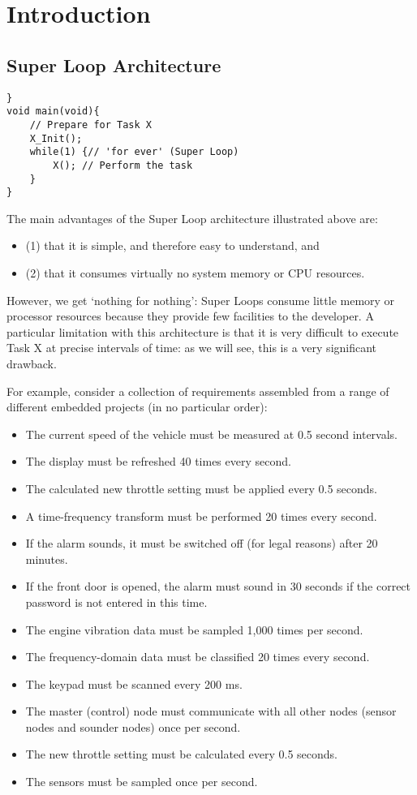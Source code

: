 
\section{Introduction}
\subsection{Super Loop Architecture}
\begin{lstlisting}[basicstyle=\small, caption=Super loop program,label = {program_super_loop}]
}
void main(void){
    // Prepare for Task X
    X_Init();
    while(1) {// 'for ever' (Super Loop)
        X(); // Perform the task
    } 
}
\end{lstlisting}
The main advantages of the Super Loop architecture illustrated above are:
\begin{itemize}
    \item (1) that it is simple, and therefore easy to understand, and 
    \item (2) that it consumes virtually no system memory or CPU resources.
\end{itemize}

However, we get ‘nothing for nothing’: Super Loops consume little memory or
processor resources because they provide few facilities to the developer. A particular
limitation with this architecture is that it is very difficult to execute Task X at precise
intervals of time: as we will see, this is a very significant drawback.

For example, consider a collection of requirements assembled from a range of different embedded projects (in no particular order):
\begin{itemize}
    \item The current speed of the vehicle must be measured at 0.5 second intervals.
    \item The display must be refreshed 40 times every second. 
    \item The calculated new throttle setting must be applied every 0.5 seconds.
    \item A time-frequency transform must be performed 20 times every second.
    \item If the alarm sounds, it must be switched off (for legal reasons) after 20 minutes.
    \item If the front door is opened, the alarm must sound in 30 seconds if the correct
password is not entered in this time.    
\item The engine vibration data must be sampled 1,000 times per second.
    \item The frequency-domain data must be classified 20 times every second.
    \item The keypad must be scanned every 200 ms.
    \item The master (control) node must communicate with all other nodes (sensor nodes
and sounder nodes) once per second.
    \item The new throttle setting must be calculated every 0.5 seconds. 
    \item The sensors must be sampled once per second.
\end{itemize}

